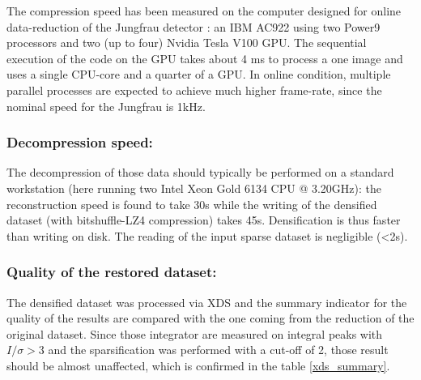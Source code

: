 \documentclass[preprint]{iucr}              %
\begin{document}

The compression speed has been measured on the computer designed for online data-reduction of the Jungfrau detector \cite{sri2021}: 
an IBM AC922 using two Power9 processors and two (up to four) Nvidia Tesla V100 GPU. 
The sequential execution of the code on the GPU takes about 4 ms to process a one image and uses a single CPU-core and a quarter of a GPU. 
In online condition, multiple parallel processes are expected to achieve much higher frame-rate, since the nominal speed for the Jungfrau is 1kHz.

\subsubsection{Decompression speed:} 
The decompression of those data should typically be performed on a standard workstation (here running two Intel Xeon Gold 6134 CPU @ 3.20GHz): the reconstruction speed is found to take 30s while the writing of the densified dataset (with bitshuffle-LZ4 compression) takes 45s. 
Densification is thus faster than writing on disk.
The reading of the input sparse dataset is negligible (<2s).

\subsubsection{Quality of the restored dataset:} 
The densified dataset was processed via XDS and the summary indicator for the quality of the results are compared with the one coming from the reduction of the original dataset. 
Since those integrator are measured on integral peaks with $I/\sigma>3$ and the sparsification was performed
with a cut-off of 2, those result should be almost unaffected, which is confirmed in the table \ref{xds_summary}.
\end{document}

